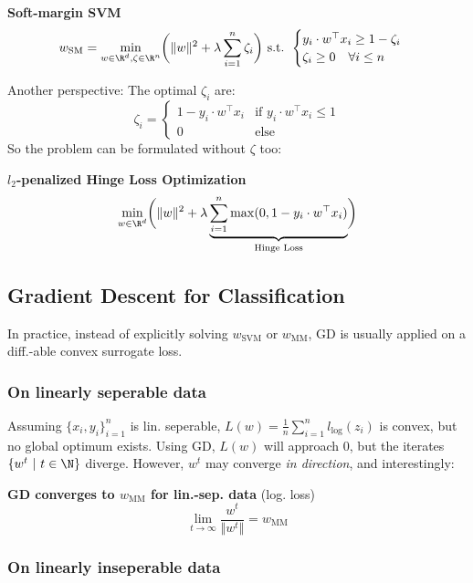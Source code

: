  \textbf{Soft-margin SVM}
$$
    w_\text{SM} = \underset{w\in\R^d,\zeta\in\R^n}{\min}\biggl( \Vert w \Vert^2 + \lambda \sum_{i=1}^{n} \zeta_i \biggr) 
    \text{ s.t. } \begin{cases}
        y_i \cdot w^\top x_i \geq 1-\zeta_i \\
        \zeta_i \geq 0 \quad \forall i \leq n
    \end{cases}
$$

Another perspective: The optimal $\zeta_i$ are:
$$
    \zeta_i = \begin{cases}
        1 - y_i \cdot w^\top x_i    & \text{if } y_i\cdot w^\top x_i \leq 1 \\
        0                           & \text{else}
    \end{cases}
$$
So the problem can be formulated without $\zeta$ too:

 \textbf{$l_2$-penalized Hinge Loss Optimization}
$$
    \underset{w\in\R^d}{\min}\biggl( \Vert w \Vert^2 + \lambda \underbrace{\sum_{i=1}^{n}\max(0, 1-y_i\cdot w^\top x_i)}_\text{Hinge Loss} \biggr)
$$

\newpage

\subsection{Gradient Descent for Classification}

In practice, instead of explicitly solving $w_\text{SVM}$ or $w_\text{MM}$, GD is usually applied on a diff.-able convex surrogate loss.

\subsubsection{On linearly seperable data}

Assuming $\{x_i,y_i\}_{i=1}^n$ is lin. seperable, $L(w) = \frac{1}{n}\sum_{i=1}^{n}l_\text{log}(z_i)$ is convex, but no global optimum exists. 
Using GD, $L(w)$ will approach $0$, but the iterates $\{ w^t \ |\ t \in \N \}$ diverge. However, $w^t$ may converge \textit{in direction}, and interestingly:

\theorem \textbf{GD converges to $w_\text{MM}$ for lin.-sep. data} (log. loss)
$$
    \underset{t\to\infty}{\lim}\frac{w^t}{\Vert w^t \Vert} = w_\text{MM}
$$

\subsubsection{On linearly inseperable data}

